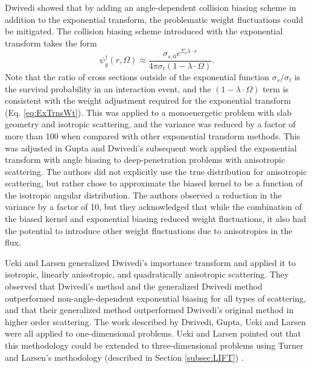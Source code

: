 Dwivedi \cite{dwivedi_new_1982} showed that by adding an angle-dependent collision
biasing scheme in addition to the exponential transform, the problematic weight
fluctuations could be mitigated. The collision biasing scheme introduced with
the exponential transform takes the form
\begin{equation}
  \psi_g^{\dagger}(r, \Omega) \approx \frac{\sigma_{s,0} e^{\Sigma_t\lambda \cdot r}}
  {4 \pi \sigma_t (1 - \lambda \cdot \Omega)}.
  \label{eq:DwivediTrns}
\end{equation}
Note that the ratio of cross sections outside of the exponential function
$\sigma_s / \sigma_t$ is the survival probability in an interaction event, and
the $(1 - \lambda \cdot \Omega)$ term is consistent with the weight adjustment
required for the exponential transform (Eq. \eqref{eq:ExTrnsWt}).
This was applied to a monoenergetic problem
with slab geometry and isotropic scattering, and the variance was reduced by a
factor of more than 100 when compared with other exponential transform methods.
This was adjusted in
Gupta and Dwivedi's subsequent work \cite{gupta_sampling_1985} applied the
exponential transform with angle biasing to deep-penetration problems with
anisotropic scattering. The authors did not explicitly use the
true distribution for anisotropic scattering, but rather chose to approximate
the biased kernel to be a function of the isotropic angular distribution. The
authors observed a reduction in the variance by a factor of 10, but they
acknowledged that while the combination of the biased kernel and exponential
biasing reduced weight fluctuations, it also had the potential to introduce
other weight fluctuations due to anisotropies in the flux.

Ueki and Larsen \cite{ueki_kinetic_1998}
generalized Dwivedi's importance transform and applied it to
isotropic, linearly anisotropic, and quadratically anisotropic scattering. They
observed that Dwivedi's method and the generalized Dwivedi method outperformed
non-angle-dependent exponential biasing for all types of scattering,
and that their generalized method
outperformed Dwivedi's original method in higher order scattering. The work
described by Dwivedi, Gupta, Ueki and Larsen were all applied to one-dimensional
problems. Ueki and Larsen pointed out that this methodology could be extended to
three-dimensional problems using Turner and Larsen's methodology
(described in Section \ref{subsec:LIFT})
\cite{ueki_kinetic_1998}.

